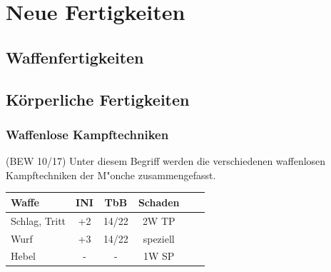\chapter{Neue Fertigkeiten}
\label{neuefertigkeiten}

\section{Waffenfertigkeiten}

\section{Körperliche Fertigkeiten}
\subsection{Waffenlose Kampftechniken}
\par (BEW 10/17) Unter diesem Begriff werden die verschiedenen waffenlosen Kampftechniken der M"onche zusammengefasst.\\
\begin{tabular}{l|c|c|c|c|r}
Waffe & INI & TbB & Schaden\\
\hline
Schlag, Tritt & +2 & 14/22 & 2W TP\\
Wurf & +3 & 14/22 & speziell \\
Hebel & - & - & 1W SP\\
\end{tabular}

